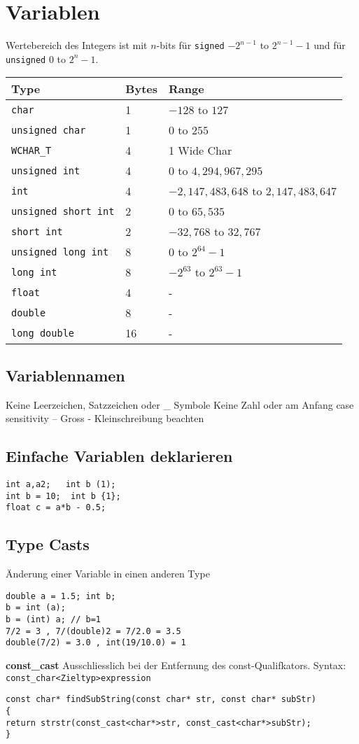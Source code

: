 \section{Variablen}
Wertebereich des Integers ist mit $n$-bits für \texttt{signed} $-2^{n-1}$ to $2^{n-1}-1$ und für \texttt{unsigned} $0$ to $2^{n}-1$.
\begin{center}
	\begin{tabular}{ | m{2.4cm} | m{0.6cm}| m{2.6cm} | } 
		\hline
		Type & Bytes & Range\\
		\hline
		\texttt{char} & 1 & $-128$ to $127$ \\ 
		\texttt{unsigned char} & 1 & $0$ to $255$ \\ 
		\texttt{WCHAR\_T} & 4 & 1 Wide Char \\ 
		\hline
		\texttt{unsigned int} & 4 & $0$ to $ 4,294,967,295$ \\ 
		\texttt{int} & 4 & $-2,147,483,648$ to $2,147,483,647$ \\ 
		\texttt{unsigned short int} & 2 & $0$ to $65,535$ \\
		\texttt{short int} & 2 & $-32,768$ to $32,767$ \\  
		\texttt{unsigned long int} & 8 & $0$ to $2^{64}-1$ \\ 
		\texttt{long int} & 8 & $-2^{63}$ to $2^{63}-1$ \\
		\hline
		\texttt{float} & 4 & - \\ 
		\texttt{double} & 8 & - \\
		\texttt{long double} &16 & - \\
		\hline
	\end{tabular}
\end{center}


\subsection{Variablennamen}
Keine Leerzeichen, Satzzeichen oder \_ Symbole Keine Zahl oder am Anfang case sensitivity – Gross - Kleinschreibung beachten

\subsection{Einfache Variablen deklarieren}
\begin{lstlisting}
int a,a2;   int b (1);
int b = 10;  int b {1};
float c = a*b - 0.5;
\end{lstlisting}
\subsection{Type Casts}
Änderung einer Variable in einen anderen Type
\begin{lstlisting}	
double a = 1.5; int b;
b = int (a);
b = (int) a; // b=1
7/2 = 3 , 7/(double)2 = 7/2.0 = 3.5
double(7/2) = 3.0 , int(19/10.0) = 1
\end{lstlisting}
\textbf{const\_cast}
Ausschliesslich bei der Entfernung des const-Qualifkators. Syntax: \texttt{const\_char<Zieltyp>expression}
\begin{lstlisting}	
const char* findSubString(const char* str, const char* subStr)
{
return strstr(const_cast<char*>str, const_cast<char*>subStr);
}
\end{lstlisting}

